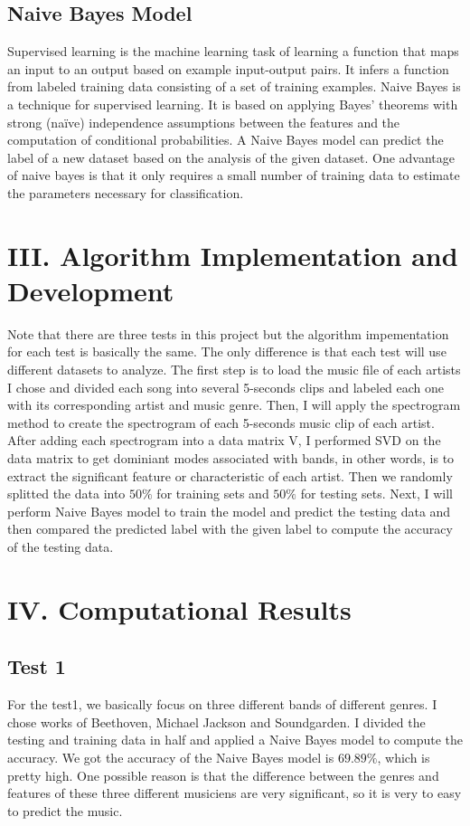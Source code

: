 \documentclass[12pt,letterpaper]{article}
\begin{document}
\subsection*{Naive Bayes Model}
Supervised learning is the machine learning task of learning a function that maps an input to an output based on example input-output pairs. It infers a function from labeled training data consisting of a set of training examples. Naive Bayes is a technique for supervised learning. It is based on applying Bayes' theorems with strong (naïve) independence assumptions between the features and the computation of conditional probabilities. A Naive Bayes model can predict the label of a new dataset based on the analysis of the given dataset. One advantage of naive bayes is that it only requires a small number of training data to estimate the parameters necessary for classification.

\section*{III. Algorithm Implementation and Development}
Note that there are three tests in this project but the algorithm impementation for each test is basically the same. The only difference is that each test will use different datasets to analyze. 
The first step is to load the music file of each artists I chose and divided each song into several 5-seconds clips and labeled each one with its corresponding artist and music genre. Then, I will apply the spectrogram method to create the spectrogram of each 5-seconds music clip of each artist. After adding each spectrogram into a data matrix V, I performed SVD on the data matrix to get dominiant modes associated with bands, in other words, is to extract the significant feature or characteristic of each artist. Then we randomly splitted the data into $50\%$ for training sets and $50\%$ for testing sets. Next, I will perform Naive Bayes model to train the model and predict the testing data and then compared the predicted label with the given label to compute the accuracy of the testing data. 

\section*{IV. Computational Results}
\subsection*{Test 1}
For the test1, we basically focus on three different bands of different genres. I chose works of Beethoven, Michael Jackson and Soundgarden. I divided the testing and training data in half and applied a Naive Bayes model to compute the accuracy. We got the accuracy of the Naive Bayes model is $69.89\%$, which is pretty high. One possible reason is that the difference between the genres and features of these three different musiciens are very significant, so it is very to easy to predict the music. 
\end{document}
